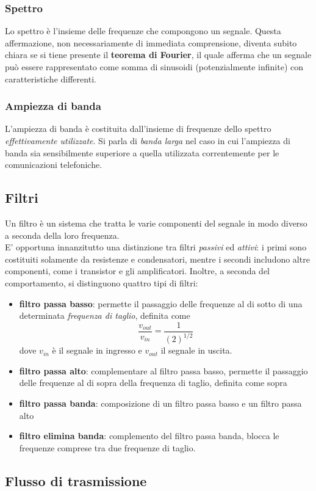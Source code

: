 \documentclass[a4paper,11pt]{paper}
\begin{document}
\subsubsection{Spettro}
Lo spettro è l'insieme delle frequenze che compongono un segnale. Questa affermazione, non necessariamente di immediata comprensione, diventa subito chiara se si tiene presente il \textbf{teorema di Fourier}, il quale afferma che un segnale può essere rappresentato come somma di sinusoidi (potenzialmente infinite) con caratteristiche differenti.
\subsubsection{Ampiezza di banda}
L'ampiezza di banda è costituita dall'insieme di frequenze dello spettro \textit{effettivamente utilizzate}. Si parla di \textit{banda larga} nel caso in cui l'ampiezza di banda sia sensibilmente superiore a quella utilizzata correntemente per le comunicazioni telefoniche.
\subsection{Filtri}
Un filtro è un sistema che tratta le varie componenti del segnale in modo diverso a seconda della loro frequenza.
\\E' opportuna innanzitutto una distinzione tra filtri \textit{passivi} ed \textit{attivi}: i primi sono costituiti solamente da resistenze e condensatori, mentre i secondi includono altre componenti, come i transistor e gli amplificatori. Inoltre, a seconda del comportamento, si distinguono quattro tipi di filtri:
\begin{itemize}
\item \textbf{filtro passa basso}: permette il passaggio delle frequenze al di sotto di una determinata \textit{frequenza di taglio}, definita come \[\frac{v_{out}}{v_{in}}=\frac{1}{(2)^{1/2}}\]
dove $v_{in}$ è il segnale in ingresso e $v_{out}$ il segnale in uscita.
\item \textbf{filtro passa alto}: complementare al filtro passa basso, permette il passaggio delle frequenze al di sopra della frequenza di taglio, definita come sopra
\item \textbf{filtro passa banda}: composizione di un filtro passa basso e un filtro passa alto
\item \textbf{filtro elimina banda}: complemento del filtro passa banda, blocca le frequenze comprese tra due frequenze di taglio.
\end{itemize}
\subsection{Flusso di trasmissione}
\end{document}

